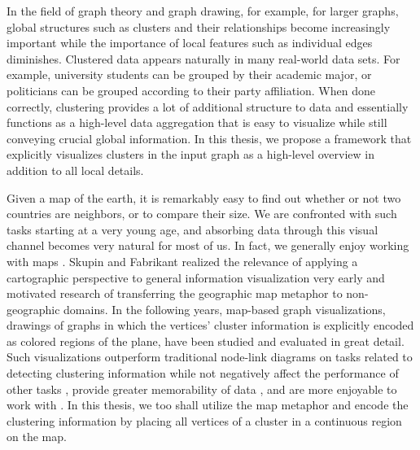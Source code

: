 \label{sect:motivation}

In the field of graph theory and graph drawing, for example, for larger graphs, global structures such as clusters and their relationships become increasingly important while the importance of local features such as  individual edges diminishes.
Clustered data appears naturally in many real-world data sets.
For example, university students can be grouped by their academic major, or politicians can be grouped according to their party affiliation.
When done correctly, clustering provides a lot of additional structure to data and essentially functions as a high-level data aggregation that is easy to visualize while still conveying crucial global information.
In this thesis, we propose a framework that explicitly visualizes clusters in the input graph as a high-level overview in addition to all local details.

Given a map of the earth, it is remarkably easy to find out whether or not two countries are neighbors, or to compare their size.
We are confronted with such tasks starting at a very young age, and absorbing data through this visual channel becomes very natural for most of us.
In fact, we generally enjoy working with maps \cite{saket2016comparing}.
Skupin and Fabrikant \cite{skupin2003spatialization} realized the relevance of applying a cartographic perspective to general information visualization very early and motivated research of transferring the geographic map metaphor to non-geographic domains.
In the following years, map-based graph visualizations, \ie{} drawings of graphs in which the vertices' cluster information is explicitly encoded as colored regions of the plane, have been studied and evaluated in great detail.
Such visualizations outperform traditional node-link diagrams on tasks related to detecting clustering information while not negatively affect the performance of other tasks \cite{saket2014node}, provide greater memorability of data \cite{saket2015map}, and are more enjoyable to work with \cite{saket2016comparing}.
In this thesis, we too shall utilize the map metaphor and encode the clustering information by placing all vertices of a cluster in a continuous region on the map.

